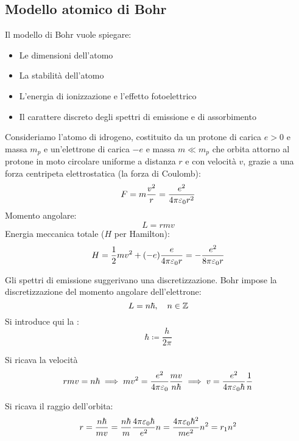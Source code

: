 \subsection{Modello atomico di Bohr}

Il modello di Bohr vuole spiegare:
\begin{itemize}
    \item Le dimensioni dell'atomo
    \item La stabilità dell'atomo
    \item L'energia di ionizzazione e l'effetto fotoelettrico
    \item Il carattere discreto degli spettri di emissione e di assorbimento
\end{itemize}

Consideriamo l'atomo di idrogeno, costituito da un protone di carica $e > 0$ e massa $m_p$ e un'elettrone di carica $-e$ e massa $m \ll m_p$ che orbita attorno al protone in moto circolare uniforme a distanza $r$ e con velocità $v$, grazie a una forza centripeta elettrostatica (la forza di Coulomb):
\begin{equation}
    F = m \frac{v^2}{r} = \frac{e^2}{4 \pi \varepsilon_0 r^2}
\end{equation}
Momento angolare:
\begin{equation}
    L = r m v
\end{equation}
Energia meccanica totale ($H$ per Hamilton):
\begin{equation}
    H = \frac{1}{2} m v^2 + (-e) \frac{e}{4 \pi \varepsilon_0 r} = - \frac{e^2}{8 \pi \varepsilon_0 r}
\end{equation}


Gli spettri di emissione suggerivano una discretizzazione.
Bohr impose la discretizzazione del momento angolare dell'elettrone:
\begin{equation}
    L = n \hbar, \quad n \in \mathbb{Z}
\end{equation}
Si introduce qui la :
\begin{equation}
    \hbar \coloneq \frac{h}{2\pi}
\end{equation}

Si ricava la velocità
\begin{gather}
    r m v = n \hbar
    \implies
    m v^2 = \frac{e^2}{4 \pi \varepsilon_0} \frac{m v}{n \hbar}
    \implies v = \frac{e^2}{4 \pi \varepsilon_0 \hbar} \frac{1}{n}
\end{gather}

Si ricava il raggio dell'orbita:
\begin{gather}
    r = \frac{n \hbar}{m v} = \frac{n \hbar}{m} \frac{4 \pi \varepsilon_0 \hbar}{e^2} n = \frac{4\pi \varepsilon_0 \hbar^2}{m e^2} n^2 = r_1 n^2
\end{gather}

